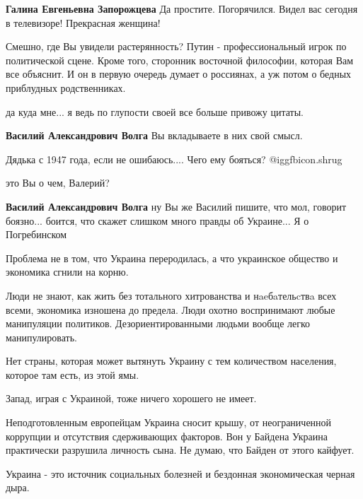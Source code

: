 \begin{itemize}
\begin{itemize}
\textbf{Галина Евгеньевна Запорожцева}
Да простите.
Погорячился.
Видел вас сегодня в телевизоре!
Прекрасная женщина!

\end{itemize} %


Смешно, где Вы увидели растерянность? Путин - профессиональный игрок по
политической сцене. Кроме того, сторонник восточной философии, которая Вам все
объяснит. И он в первую очередь думает о россиянах, а уж потом о бедных
приблудных родственниках.

\begin{itemize} %
да куда мне... я ведь по глупости своей все больше привожу цитаты.

\textbf{Василий Александрович Волга} Вы вкладываете в них свой смысл.
\end{itemize} %

Дядька с 1947 года, если не ошибаюсь....
Чего ему бояться?
 @igg{fbicon.shrug} 

\begin{itemize} %
это Вы о чем, Валерий?

\textbf{Василий Александрович Волга} ну Вы же Василий пишите, что мол, говорит боязно... боится, что скажет слишком много правды об Украине...
Я о Погребинском
\end{itemize} %


Проблема не в том, что Украина переродилась, а что украинское общество и
экономика сгнили на корню.

Люди не знают, как жить без тотального хитрованства и нaeбaтельcтвa всех всеми,
экономика изношена до предела. Люди охотно воспринимают любые манипуляции
политиков. Дезориентированными людьми вообще легко манипулировать.

Нет страны, которая может вытянуть Украину с тем количеством населения, которое
там есть, из этой ямы.

Запад, играя с Украиной, тоже ничего хорошего не имеет.

Неподготовленным европейцам Украина сносит крышу, от неограниченной коррупции и
отсутствия сдерживающих факторов. Вон у Байдена Украина практически разрушила
личность сына. Не думаю, что Байден от этого кайфует.

Украина - это источник социальных болезней и бездонная экономическая черная
дыра.


\end{itemize}

